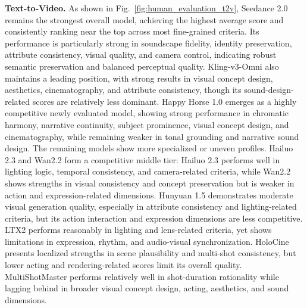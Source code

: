 \documentclass{llmxive}
\begin{document}
\noindent
\textbf{Text-to-Video.} As shown in Fig.~\ref{fig:human_evaluation_t2v}, Seedance 2.0 remains the strongest overall model, achieving the highest average score and consistently ranking near the top across most fine-grained criteria. Its performance is particularly strong in soundscape fidelity, identity preservation, attribute consistency, visual quality, and camera control, indicating robust semantic preservation and balanced perceptual quality. Kling-v3-Omni also maintains a leading position, with strong results in visual concept design, aesthetics, cinematography, and attribute consistency, though its sound-design-related scores are relatively less dominant. Happy Horse 1.0 emerges as a highly competitive newly evaluated model, showing strong performance in chromatic harmony, narrative continuity, subject prominence, visual concept design, and cinematography, while remaining weaker in tonal grounding and narrative sound design. The remaining models show more specialized or uneven profiles. Hailuo 2.3 and Wan2.2 form a competitive middle tier: Hailuo 2.3 performs well in lighting logic, temporal consistency, and camera-related criteria, while Wan2.2 shows strengths in visual consistency and concept preservation but is weaker in action and expression-related dimensions. Hunyuan 1.5 demonstrates moderate visual generation quality, especially in attribute consistency and lighting-related criteria, but its action interaction and expression dimensions are less competitive. LTX2 performs reasonably in lighting and lens-related criteria, yet shows limitations in expression, rhythm, and audio-visual synchronization. HoloCine presents localized strengths in scene plausibility and multi-shot consistency, but lower acting and rendering-related scores limit its overall quality. MultiShotMaster performs relatively well in shot-duration rationality while lagging behind in broader visual concept design, acting, aesthetics, and sound dimensions.
\end{document}
